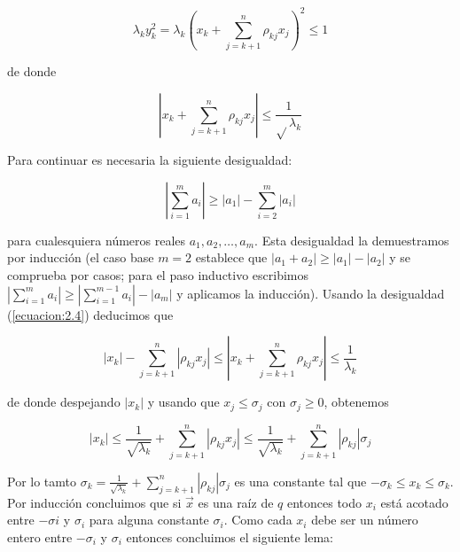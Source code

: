 \begin{equation*}
\lambda_{k}y_{k}^{2} = \lambda_{k}\left(x_{k} + \sum_{j=k+1}^{n}\rho_{kj}x_{j}\right)^{2} \leq 1
\end{equation*} 

de donde 

\begin{equation*}
\left|x_{k} + \sum_{j=k+1}^{n} \rho_{kj} x_{j}\right| \leq \frac{1}{\sqrt{}\lambda_{k}}
\end{equation*} 

Para continuar es necesaria la siguiente desigualdad:

\begin{equation}
\left|\sum_{i=1}^{m} a_{i}\right| \geq \left|a_{1}\right| - \sum_{i=2}^{m}\left|a_{i}\right|
\label{ecuacion:2.4}
\end{equation} 

para cualesquiera números reales $a_{1}, a_{2}, \ldots, a_{m}$. Esta desigualdad la demuestramos por inducción (el caso base $m=2$ establece que $\left|a_{1} + a_{2}\right| \geq \left|a_{1}\right| - \left|a_{2}\right|$ y se comprueba por casos; para el paso inductivo escribimos $\left|\sum_{i=1}^{m}a_{i}\right| \geq \left|\sum_{i=1}^{m-1}a_{i}\right| - \left|a_{m}\right|$ y aplicamos la inducción). Usando la desigualdad (\ref{ecuacion:2.4}) deducimos que 

\begin{equation*}
\left|x_{k}\right| - \sum_{j=k+1}^{n}\left| \rho_{kj}x_{j}\right| \leq \left|x_{k} + \sum_{j=k+1}^{n}\rho_{kj}x_{j}\right| \leq \frac{1}{\lambda_{k}}
\end{equation*} 

de donde despejando $\left|x_{k}\right|$ y usando que $x_{j} \leq \sigma_{j}$ con $\sigma_{j} \geq 0$, obtenemos

\begin{equation*}
\left|x_{k}\right| \leq \frac{1}{\sqrt{\lambda_{k}}} + \sum_{j=k+1}^{n}\left| \rho_{kj}x_{j}\right| \leq \frac{1}{\sqrt{\lambda_{k}}} + \sum_{j=k+1}^{n}\left|\rho_{kj}\right|\sigma_{j}
\end{equation*} 

Por lo tamto $\sigma_{k} = \frac{1}{\sqrt{\lambda_{k}}} + \sum_{j=k+1}^{n}\left|\rho_{kj}\right|\sigma_{j}$ es una constante tal que $-\sigma_{k} \leq x_{k} \leq \sigma_{k}$. Por inducción concluimos que si $\overrightarrow{x}$ es una raíz de $q$ entonces todo $x_{i}$ está acotado entre $-\sigma{i}$ y $\sigma_{i}$ para alguna constante $\sigma_{i}$. Como cada $x_{i}$ debe ser un número entero entre $-\sigma_{i}$ y $\sigma_{i}$ entonces concluimos el siguiente lema:

